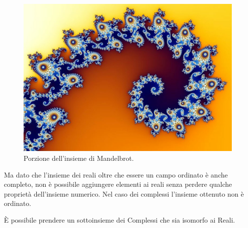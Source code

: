 \begin{figure}
\begin{center}
\begin{inaccessibleblock}
\includegraphics[scale=0.40]{img/fractal.jpg}
\end{inaccessibleblock}
\caption{Porzione dell'insieme di Mandelbrot.}
\label{fig:mandelbrot}
\end{center}
\end{figure}

Ma dato che l'insieme dei reali oltre che essere un campo ordinato è anche 
completo, non è possibile aggiungere elementi ai reali senza perdere 
qualche proprietà dell'insieme numerico. 
Nel caso dei complessi l'insieme ottenuto non è ordinato.

È possibile prendere un sottoinsieme dei Complessi che sia isomorfo ai Reali.

% 


\newpage %



% 
